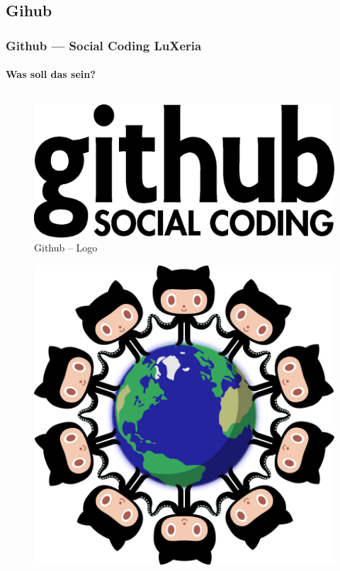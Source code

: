 \subsection{Gihub}
\begin{frame}
    \frametitle{Github --- Social Coding \hfill{} \footnotesize{LuXeria}}
    \framesubtitle{Was soll das sein?}
    \begin{columns}
        \begin{column}{5cm}
            \begin{figure}
                \includegraphics[scale=0.15]{github_logo.eps}
                \caption{Github -- Logo}
            \end{figure}
            \begin{figure}
                \includegraphics[scale=0.08]{github_network.jpg}

\end{figure}
\end{column}
\end{columns}
\end{frame}
